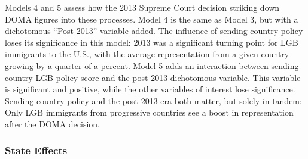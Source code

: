 \documentclass[
  11pt,
]{article}
\begin{document}
Models 4 and 5 assess how the 2013 Supreme Court decision striking down DOMA figures into these processes. Model 4 is the same as Model 3, but with a dichotomous ``Post-2013'' variable added. The influence of sending-country policy loses its significance in this model: 2013 was a significant turning point for LGB immigrants to the U.S., with the average representation from a given country growing by a quarter of a percent. Model 5 adds an interaction between sending-country LGB policy score and the post-2013 dichotomous variable. This variable is significant and positive, while the other variables of interest lose significance. Sending-country policy and the post-2013 era both matter, but solely in tandem: Only LGB immigrants from progressive countries see a boost in representation after the DOMA decision.

\hypertarget{state-effects}{%
\subsubsection{State Effects}\label{state-effects}}
\end{document}
